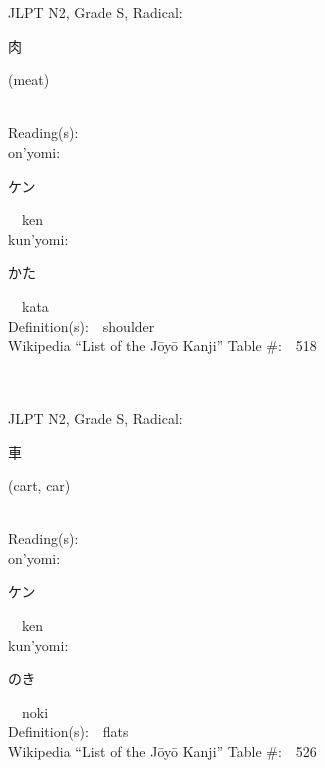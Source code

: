 \begin{multicols}{2}
{JLPT N2, Grade S, Radical:\ \ {\begin{CJK}{UTF8}{min} 肉 \end{CJK}} (meat) } \\
Reading(s):\ \ \\
{\hspace*{1em}}on'yomi:\ \ \\
{\hspace*{2em}}{\begin{CJK}{UTF8}{min} ケン \end{CJK}}\ \ ken\ \ \\
{\hspace*{1em}}kun'yomi:\ \ \\
{\hspace*{2em}}{\begin{CJK}{UTF8}{min} かた \end{CJK}}\ \ kata\ \ \\
Definition(s):\ \ shoulder \\
Wikipedia ``List of the J\=oy\=o Kanji'' Table \#:\ \ 518 \\
\ \ \\
{\fontsize{34pt}{40pt}  }\ \ \\  %
{JLPT N2, Grade S, Radical:\ \ {\begin{CJK}{UTF8}{min} 車 \end{CJK}} (cart, car) } \\
Reading(s):\ \ \\
{\hspace*{1em}}on'yomi:\ \ \\
{\hspace*{2em}}{\begin{CJK}{UTF8}{min} ケン \end{CJK}}\ \ ken\ \ \\
{\hspace*{1em}}kun'yomi:\ \ \\
{\hspace*{2em}}{\begin{CJK}{UTF8}{min} のき \end{CJK}}\ \ noki\ \ \\
Definition(s):\ \ flats \\
Wikipedia ``List of the J\=oy\=o Kanji'' Table \#:\ \ 526 \\
\ \ \\
{\fontsize{34pt}{40pt}  }\ \ \\  %

\end{multicols}
